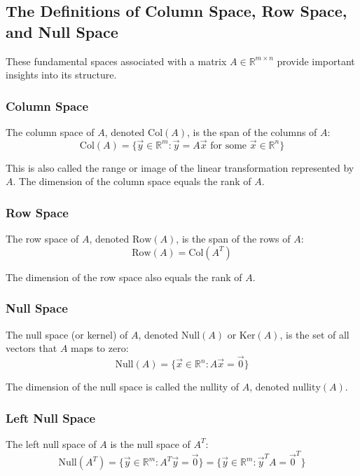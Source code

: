 \subsection{The Definitions of Column Space, Row Space, and Null Space}

These fundamental spaces associated with a matrix $A \in \mathbb{R}^{m \times n}$ provide important insights into its structure.

\subsubsection{Column Space}
The column space of $A$, denoted $\text{Col}(A)$, is the span of the columns of $A$:
\begin{equation*}
\text{Col}(A) = \{\vec{y} \in \mathbb{R}^m : \vec{y} = A\vec{x} \text{ for some } \vec{x} \in \mathbb{R}^n\}
\end{equation*}

This is also called the range or image of the linear transformation represented by $A$. The dimension of the column space equals the rank of $A$.

\subsubsection{Row Space}
The row space of $A$, denoted $\text{Row}(A)$, is the span of the rows of $A$:
\begin{equation*}
\text{Row}(A) = \text{Col}(A^T)
\end{equation*}

The dimension of the row space also equals the rank of $A$.

\subsubsection{Null Space}
The null space (or kernel) of $A$, denoted $\text{Null}(A)$ or $\text{Ker}(A)$, is the set of all vectors that $A$ maps to zero:
\begin{equation*}
\text{Null}(A) = \{\vec{x} \in \mathbb{R}^n : A\vec{x} = \vec{0}\}
\end{equation*}

The dimension of the null space is called the nullity of $A$, denoted $\text{nullity}(A)$.

\subsubsection{Left Null Space}
The left null space of $A$ is the null space of $A^T$:
\begin{equation*}
\text{Null}(A^T) = \{\vec{y} \in \mathbb{R}^m : A^T\vec{y} = \vec{0}\} = \{\vec{y} \in \mathbb{R}^m : \vec{y}^T A = \vec{0}^T\}
\end{equation*}

